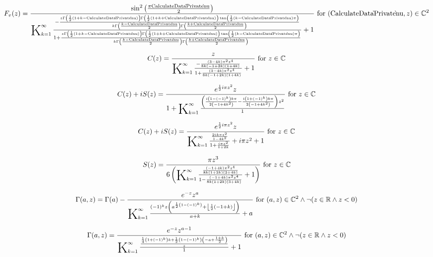 \documentclass{article}
\newcommand{\bigK}{\mathop{\raisebox{-5pt}{\huge K}}}
\begin{document}
\[F_v(z)=\frac{\sin ^2\left(\frac{\pi  \text{CalculateData$\grave{ }$Private$\grave{ }$nu}}{2}\right)}{\bigK_{k=1}^{\infty}\frac{-\frac{z \Gamma \left(\frac{1}{2} (1+k-\text{CalculateData$\grave{ }$Private$\grave{ }$nu})\right) \Gamma \left(\frac{1}{2} (1+k+\text{CalculateData$\grave{ }$Private$\grave{ }$nu})\right) \tan \left(\frac{1}{2} (k-\text{CalculateData$\grave{ }$Private$\grave{ }$nu}) \pi \right)}{k \Gamma \left(\frac{k-\text{CalculateData$\grave{ }$Private$\grave{ }$nu}}{2}\right) \Gamma \left(\frac{k+\text{CalculateData$\grave{ }$Private$\grave{ }$nu}}{2}\right)}}{1+\frac{z \Gamma \left(\frac{1}{2} (1+k-\text{CalculateData$\grave{ }$Private$\grave{ }$nu})\right) \Gamma \left(\frac{1}{2} (1+k+\text{CalculateData$\grave{ }$Private$\grave{ }$nu})\right) \tan \left(\frac{1}{2} (k-\text{CalculateData$\grave{ }$Private$\grave{ }$nu}) \pi \right)}{k \Gamma \left(\frac{k-\text{CalculateData$\grave{ }$Private$\grave{ }$nu}}{2}\right) \Gamma \left(\frac{k+\text{CalculateData$\grave{ }$Private$\grave{ }$nu}}{2}\right)}}+1}\text{ for }(\text{CalculateData$\grave{ }$Private$\grave{ }$nu},z)\in \mathbb{C}^2\] 

\[C(z)=\frac{z}{\bigK_{k=1}^{\infty}\frac{-\frac{(3-4 k) \pi ^2 z^4}{8 k (-1+2 k) (1+4 k)}}{1+\frac{(3-4 k) \pi ^2 z^4}{8 k (-1+2 k) (1+4 k)}}+1}\text{ for }z\in \mathbb{C}\] 

\[C(z)+i S(z)=\frac{e^{\frac{1}{2} i \pi  z^2} z}{1+\bigK_{k=1}^{\infty}\frac{\left(\frac{i \left(1-(-1)^k\right) k \pi }{2 \left(-1+4 k^2\right)}-\frac{i \left(1+(-1)^k\right) k \pi }{2 \left(-1+4 k^2\right)}\right) z^2}{1}}\text{ for }z\in \mathbb{C}\] 

\[C(z)+i S(z)=\frac{e^{\frac{1}{2} i \pi  z^2} z}{\bigK_{k=1}^{\infty}\frac{\frac{2 i k \pi  z^2}{1-4 k^2}}{1+\frac{i \pi  z^2}{1+2 k}}+i \pi  z^2+1}\text{ for }z\in \mathbb{C}\] 

\[S(z)=\frac{\pi  z^3}{6 \left(\bigK_{k=1}^{\infty}\frac{\frac{(-1+4 k) \pi ^2 z^4}{8 k (1+2 k) (3+4 k)}}{1-\frac{(-1+4 k) \pi ^2 z^4}{8 k (1+2 k) (3+4 k)}}+1\right)}\text{ for }z\in \mathbb{C}\] 

\[\Gamma (a,z)=\Gamma (a)-\frac{e^{-z} z^a}{\bigK_{k=1}^{\infty}\frac{(-1)^k z \left(a^{\frac{1}{2} \left(1-(-1)^k\right)}+\left\lfloor \frac{1}{2} (-1+k)\right\rfloor \right)}{a+k}+a}\text{ for }(a,z)\in \mathbb{C}^2\land \neg (z\in \mathbb{R}\land z<0)\] 

\[\Gamma (a,z)=\frac{e^{-z} z^{a-1}}{\bigK_{k=1}^{\infty}\frac{\frac{\frac{1}{4} \left(1+(-1)^k\right) k+\frac{1}{2} \left(1-(-1)^k\right) \left(-a+\frac{1+k}{2}\right)}{z}}{1}+1}\text{ for }(a,z)\in \mathbb{C}^2\land \neg (z\in \mathbb{R}\land z<0)\] 
\end{document}
